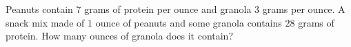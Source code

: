 Peanuts contain $7$ grams of protein per ounce and granola $3$ grams per ounce. A snack mix made of $1$ ounce of peanuts and some granola contains $28$ grams of protein. How many ounces of granola does it contain?
